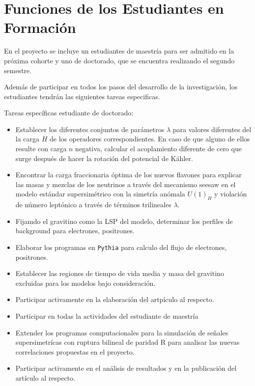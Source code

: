 \section{ Funciones de los Estudiantes en Formación }



En el proyecto se incluye un estudiantes de maestría para ser admitido
en la próxima cohorte y uno de doctorado, que se encuentra realizando
el segundo semestre.

Además de participar en todos los pasos del desarrollo de la
investigación, los estudiantes  tendrán las siguientes
tareas especificas.

Tareas específicas estudiante de doctorado:
\begin{itemize}
\item Establecer los diferentes conjuntos de parámetros $\lambda$ para valores diferentes del la carga $H$ de los operadores correspondientes. En caso de que alguno de ellos resulte con carga $n$ negativa, calcular el acoplamiento diferente de cero que surge después de hacer la rotación del potencial de K\"ahler.
\item Encontrar la carga fraccionaria óptima de los nuevos flavones para explicar las masas y mezclas de los neutrinos a través del mecanismo seesaw en el modelo estándar supersimétrico con la simetría anómala $U(1)_H$ y violación de número leptónico a través de términos trilineales $\lambda$.
\item Fijamdo el gravitino como la LSP del modelo, determinar los perfiles de background para electrones, positrones.
\item Elaborar los programas en \texttt{Pythia} para calculo del flujo de electrones, positrones.
\item Establecer las regiones de tiempo de vida media y masa del gravitino excluidas para los modelos bajo consideración.
\item Participar activamente en la elaboración del artpículo al respecto.
\item Participar en todas la actividades del estudiante de maestría
\item Extender los programas computacionales para la simulación de señales supersimetrícas con ruptura bilineal de paridad R para analisar las nuevas correlaciones propuestas en el proyecto.
\item Participar activamente en el análisis de resultados y en la
  publicación del artículo al respecto.
\end{itemize}


